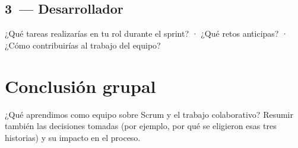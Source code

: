 \documentclass[12pt,letterpaper]{article}
\newcommand{\IntC}{3}
\begin{document}
\subsection*{\IntC\ — Desarrollador}

\begin{redactar}
\small
¿Qué tareas realizarías en tu rol durante el sprint? · ¿Qué retos anticipas? ·
¿Cómo contribuirías al trabajo del equipo?
\end{redactar}

\section{Conclusión grupal}

\begin{redactar}
\small
¿Qué aprendimos como equipo sobre Scrum y el trabajo colaborativo? Resumir
también las decisiones tomadas (por ejemplo, por qué se eligieron esas tres
historias) y su impacto en el proceso.
\end{redactar}
\end{document}
